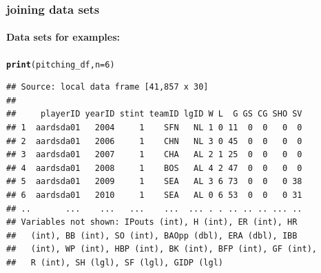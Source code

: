 \documentclass{beamer}\usepackage[]{graphicx}\usepackage[]{color}
\makeatletter
\newcommand{\hlnum}[1]{\textcolor[rgb]{0.686,0.059,0.569}{#1}}%
\newcommand{\hlstd}[1]{\textcolor[rgb]{0.345,0.345,0.345}{#1}}%
\newcommand{\hlkwc}[1]{\textcolor[rgb]{0.333,0.667,0.333}{#1}}%
\newcommand{\hlkwd}[1]{\textcolor[rgb]{0.737,0.353,0.396}{\textbf{#1}}}%
\newenvironment{kframe}{%
 \def\at@end@of@kframe{}%
 \ifinner\ifhmode%
  \def\at@end@of@kframe{\end{minipage}}%
  \begin{minipage}{\columnwidth}%
 \fi\fi%
 \def\FrameCommand##1{\hskip\@totalleftmargin \hskip-\fboxsep
 \colorbox{shadecolor}{##1}\hskip-\fboxsep
     \hskip-\linewidth \hskip-\@totalleftmargin \hskip\columnwidth}%
 \MakeFramed {\advance\hsize-\width
   \@totalleftmargin\z@ \linewidth\hsize
   \@setminipage}}%
 {\par\unskip\endMakeFramed%
 \at@end@of@kframe}
\newenvironment{knitrout}{}{} %
\makeatother
\begin{document}
\begin{frame}[fragile]
  \frametitle{joining data sets} 
  \framesubtitle{Data sets for examples:}
\begin{knitrout}\footnotesize
{}\color{fgcolor}\begin{kframe}
\begin{alltt}
\hlkwd{print}\hlstd{(pitching_df,} \hlkwc{n} \hlstd{=} \hlnum{6}\hlstd{)}
\end{alltt}
\begin{verbatim}
## Source: local data frame [41,857 x 30]
## 
##     playerID yearID stint teamID lgID W L  G GS CG SHO SV
## 1  aardsda01   2004     1    SFN   NL 1 0 11  0  0   0  0
## 2  aardsda01   2006     1    CHN   NL 3 0 45  0  0   0  0
## 3  aardsda01   2007     1    CHA   AL 2 1 25  0  0   0  0
## 4  aardsda01   2008     1    BOS   AL 4 2 47  0  0   0  0
## 5  aardsda01   2009     1    SEA   AL 3 6 73  0  0   0 38
## 6  aardsda01   2010     1    SEA   AL 0 6 53  0  0   0 31
## ..       ...    ...   ...    ...  ... . . .. .. .. ... ..
## Variables not shown: IPouts (int), H (int), ER (int), HR
##   (int), BB (int), SO (int), BAOpp (dbl), ERA (dbl), IBB
##   (int), WP (int), HBP (int), BK (int), BFP (int), GF (int),
##   R (int), SH (lgl), SF (lgl), GIDP (lgl)
\end{verbatim}
\end{kframe}
\end{knitrout}
\end{frame} 
\end{document}
